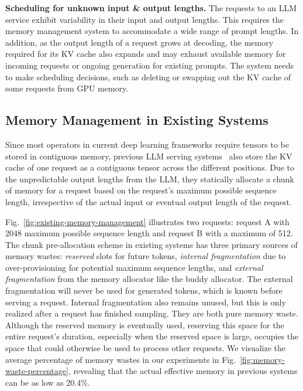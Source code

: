 \documentclass[sigplan,10pt]{acmart}
\newcommand{\heading}[1]{\vspace{4pt}\noindent\textbf{#1}}
\begin{document}
\heading{Scheduling for unknown input \& output lengths.} The requests to an LLM service exhibit variability in their input and output lengths. This requires the memory management system to accommodate a wide range of prompt lengths. In addition, as the output length of a request grows at decoding, the memory required for its KV cache also expands and may exhaust available memory for incoming requests or ongoing generation for existing prompts. The system needs to make scheduling decisions, such as deleting or swapping out the KV cache of some requests from GPU memory.

\subsection{Memory Management in Existing Systems}

\label{sec:memory-management-in-existing-systems}

Since most operators in current deep learning frameworks \cite{paszke2019pytorch, olston2017tensorflow} require tensors to be stored in contiguous memory, previous LLM serving systems~\cite{yu2022orca,nvidiaft} also store the KV cache of one request as a contiguous tensor across the different positions. Due to the unpredictable output lengths from the LLM, they statically allocate a chunk of memory for a request based on the request's maximum possible sequence length, irrespective of the actual input or eventual output length of the request. 

Fig.~\ref{fig:existing-memory-management} illustrates two requests: request A with 2048 maximum possible sequence length and request B with a maximum of 512. The chunk pre-allocation scheme in existing systems has three primary sources of memory wastes: \emph{reserved} slots for future tokens, \emph{internal fragmentation} due to over-provisioning for potential maximum sequence lengths, and \emph{external fragmentation} from the memory allocator like the buddy allocator. The external fragmentation will never be used for generated tokens, which is known before serving a request. Internal fragmentation also remains unused, but this is only realized after a request has finished sampling. They are both pure memory waste. 
Although the reserved memory is eventually used, reserving this space for the entire request's duration, especially when the reserved space is large, occupies the space that could otherwise be used to process other requests. We visualize the average percentage of memory wastes in our experiments in Fig.~\ref{fig:memory-waste-percentage}, revealing that the actual effective memory in previous systems can be as low as 20.4\%.
\end{document}
